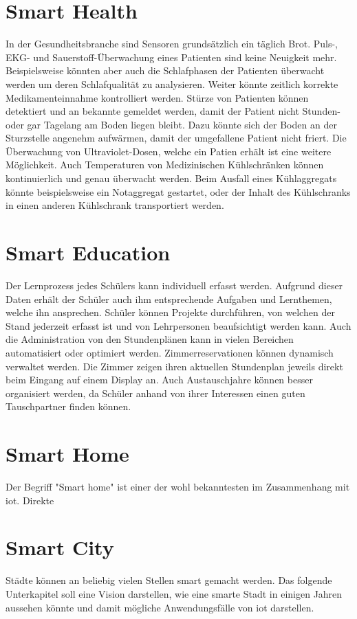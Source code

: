 \section{Smart Health}
In der Gesundheitsbranche sind Sensoren grundsätzlich ein täglich Brot. Puls-, EKG- und Sauerstoff-Überwachung eines Patienten sind keine Neuigkeit mehr. Beispielsweise könnten aber auch die Schlafphasen der Patienten überwacht werden um deren Schlafqualität zu analysieren. Weiter könnte zeitlich korrekte Medikamenteinnahme kontrolliert werden. Stürze von Patienten können detektiert und an bekannte gemeldet werden, damit der Patient nicht Stunden- oder gar Tagelang am Boden liegen bleibt. Dazu könnte sich der Boden an der Sturzstelle angenehm aufwärmen, damit der umgefallene Patient nicht friert. Die Überwachung von Ultraviolet-Dosen, welche ein Patien erhält ist eine weitere Möglichkeit. Auch Temperaturen von Medizinischen Kühlschränken können kontinuierlich und genau überwacht werden. Beim Ausfall eines Kühlaggregats könnte beispielsweise ein Notaggregat gestartet, oder der Inhalt des Kühlschranks in einen anderen Kühlschrank transportiert werden.

\section{Smart Education}
Der Lernprozess jedes Schülers kann individuell erfasst werden. Aufgrund dieser Daten erhält der Schüler auch ihm entsprechende Aufgaben und Lernthemen, welche ihn ansprechen. Schüler können Projekte durchführen, von welchen der Stand jederzeit erfasst ist und von Lehrpersonen beaufsichtigt werden kann. Auch die Administration von den Stundenplänen kann in vielen Bereichen automatisiert oder optimiert werden. Zimmerreservationen können dynamisch verwaltet werden. Die Zimmer zeigen ihren aktuellen Stundenplan jeweils direkt beim Eingang auf einem Display an. Auch Austauschjahre können besser organisiert werden, da Schüler anhand von ihrer Interessen einen guten Tauschpartner finden können.

\section{Smart Home}
Der Begriff "Smart home" ist einer der wohl bekanntesten im Zusammenhang mit \gls{iot}. Direkte 

\section{Smart City}
Städte können an beliebig vielen Stellen \glqq{}smart\grqq{} gemacht werden. Das folgende Unterkapitel soll eine Vision darstellen, wie eine smarte Stadt in einigen Jahren aussehen könnte und damit mögliche Anwendungsfälle von \gls{iot} darstellen.


